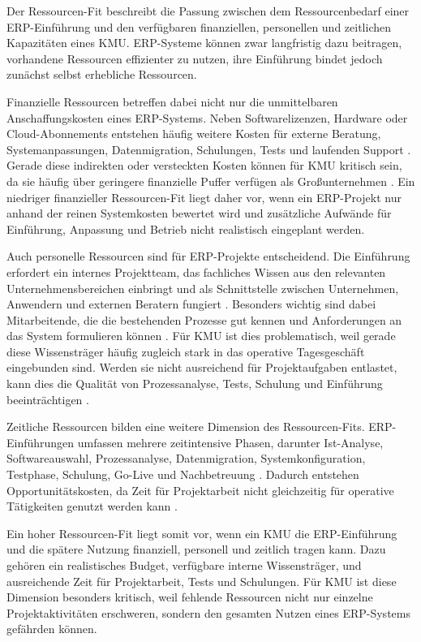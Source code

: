 
Der Ressourcen-Fit beschreibt die Passung zwischen dem Ressourcenbedarf einer
ERP-Einführung und den verfügbaren finanziellen, personellen und zeitlichen 
Kapazitäten eines KMU. ERP-Systeme können zwar langfristig dazu
beitragen, vorhandene Ressourcen effizienter zu nutzen, ihre Einführung bindet
jedoch zunächst selbst erhebliche Ressourcen.

Finanzielle Ressourcen betreffen dabei nicht nur die unmittelbaren
Anschaffungskosten eines ERP-Systems. Neben Softwarelizenzen, Hardware oder
Cloud-Abonnements entstehen häufig weitere Kosten für externe Beratung,
Systemanpassungen, Datenmigration, Schulungen, Tests und laufenden Support
\parencite{Jha2008, Leyh2015}. Gerade diese indirekten oder versteckten Kosten können
für KMU kritisch sein, da sie häufig über geringere finanzielle Puffer
verfügen als Großunternehmen \parencite{Leyh2015}. Ein niedriger finanzieller Ressourcen-Fit liegt
daher vor, wenn ein ERP-Projekt nur anhand der reinen Systemkosten bewertet
wird und zusätzliche Aufwände für Einführung, Anpassung und Betrieb nicht
realistisch eingeplant werden.

Auch personelle Ressourcen sind für ERP-Projekte entscheidend. Die Einführung
erfordert ein internes Projektteam, das fachliches Wissen aus den relevanten
Unternehmensbereichen einbringt und als Schnittstelle zwischen Unternehmen,
Anwendern und externen Beratern fungiert \parencite{Leyh2015}. Besonders wichtig sind dabei
Mitarbeitende, die die bestehenden Prozesse gut kennen und Anforderungen an
das System formulieren können \parencite{Leyh2017}. Für KMU ist dies problematisch, weil gerade
diese Wissensträger häufig zugleich stark in das operative Tagesgeschäft
eingebunden sind. Werden sie nicht ausreichend für Projektaufgaben entlastet,
kann dies die Qualität von Prozessanalyse, Tests, Schulung und Einführung
beeinträchtigen \parencite{Jha2008,Leyh2015}.

Zeitliche Ressourcen bilden eine weitere Dimension des Ressourcen-Fits.
ERP-Einführungen umfassen mehrere zeitintensive Phasen, darunter
Ist-Analyse, Softwareauswahl, Prozessanalyse, Datenmigration,
Systemkonfiguration, Testphase, Schulung, Go-Live und Nachbetreuung \parencite{Leyh2015,Leyh2019}. 
Dadurch entstehen Opportunitätskosten, da Zeit für Projektarbeit nicht gleichzeitig für
operative Tätigkeiten genutzt werden kann \parencite{Leyh2015,Leyh2017}. 


Ein hoher Ressourcen-Fit liegt somit vor, wenn ein KMU die ERP-Einführung und
die spätere Nutzung finanziell, personell und zeitlich tragen kann.
Dazu gehören ein realistisches Budget, verfügbare interne Wissensträger,
und ausreichende Zeit für Projektarbeit, Tests und Schulungen. Für KMU ist diese
Dimension besonders kritisch, weil fehlende Ressourcen nicht nur einzelne
Projektaktivitäten erschweren, sondern den gesamten Nutzen eines ERP-Systems
gefährden können.

